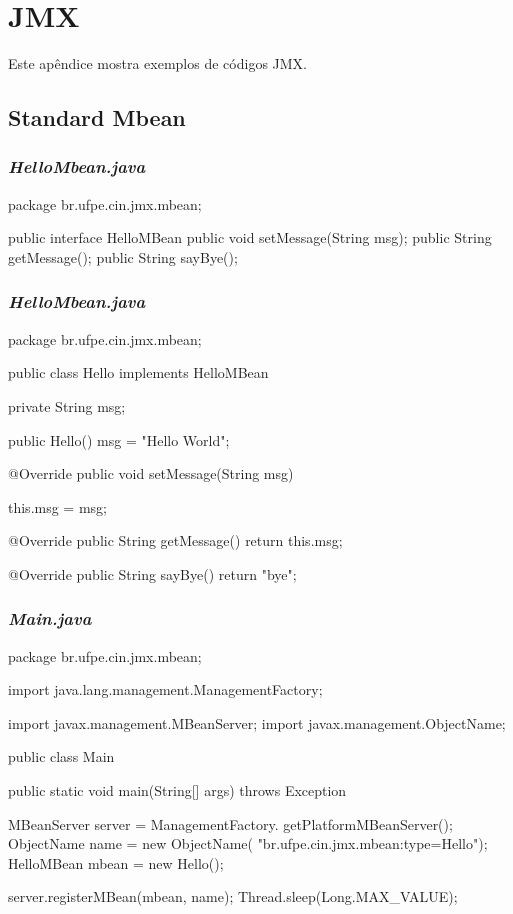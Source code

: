 \chapter{JMX}

Este apêndice mostra exemplos de códigos JMX.\\

\section{Standard Mbean}

\subsection*{\!\textsl{\textbf{HelloMbean.java}}}
\begin{verbatimtab}[4]
package br.ufpe.cin.jmx.mbean;

public interface HelloMBean {
	public void setMessage(String msg);
	public String getMessage();
	public String sayBye();
}
\end{verbatimtab}

\subsection*{\!\textsl{\textbf{HelloMbean.java}}}
\begin{verbatimtab}[4]
package br.ufpe.cin.jmx.mbean;

public class Hello implements HelloMBean {

	private String msg;

	public Hello() {
		msg = "Hello World";
	}

	@Override
	public void setMessage(String msg) {
		this.msg = msg;

	}

	@Override
	public String getMessage() {
		return this.msg;
	}

	@Override
	public String sayBye() {
		return "bye";
	}
}
\end{verbatimtab}

\subsection*{\!\textsl{\textbf{Main.java}}}
\begin{verbatimtab}[4]
package br.ufpe.cin.jmx.mbean;

import java.lang.management.ManagementFactory;

import javax.management.MBeanServer;
import javax.management.ObjectName;

public class Main {

	public static void main(String[] args) throws Exception {

		MBeanServer server = ManagementFactory.
				getPlatformMBeanServer();
		ObjectName name = new ObjectName(
				"br.ufpe.cin.jmx.mbean:type=Hello");
		HelloMBean mbean = new Hello();

		server.registerMBean(mbean, name);
		Thread.sleep(Long.MAX_VALUE);
	}
}
\end{verbatimtab}
